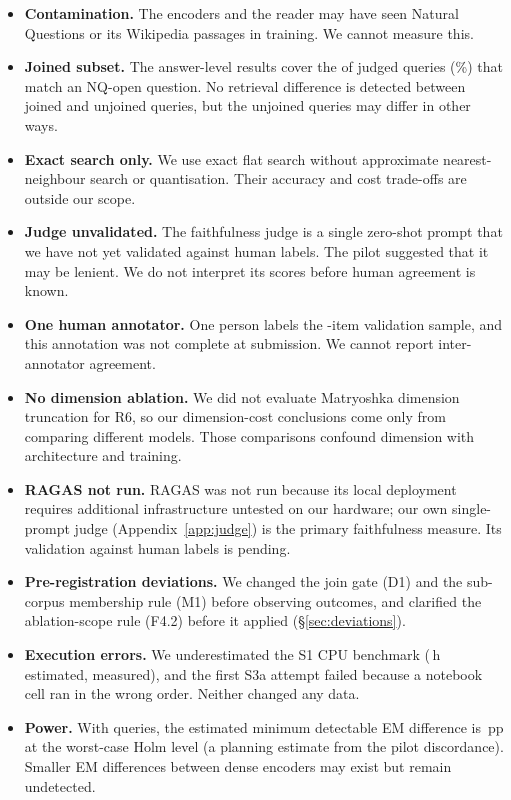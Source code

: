 \begin{itemize}
\item \textbf{Contamination.} The encoders and the reader may have seen Natural Questions or its Wikipedia passages in training. We cannot measure this.
\item \textbf{Joined subset.} The answer-level results cover the  of  judged queries (\%) that match an NQ-open question. No retrieval difference is detected between joined and unjoined queries, but the unjoined queries may differ in other ways.
\item \textbf{Exact search only.} We use exact flat search without approximate nearest-neighbour search or quantisation. Their accuracy and cost trade-offs are outside our scope.
\item \textbf{Judge unvalidated.} The faithfulness judge is a single zero-shot prompt that we have not yet validated against human labels. The pilot suggested that it may be lenient. We do not interpret its scores before human agreement is known.
\item \textbf{One human annotator.} One person labels the -item validation sample, and this annotation was not complete at submission. We cannot report inter-annotator agreement.
\item \textbf{No dimension ablation.} We did not evaluate Matryoshka dimension truncation \citep{kusupati2022matryoshka} for R6, so our dimension-cost conclusions come only from comparing different models. Those comparisons confound dimension with architecture and training.
\item \textbf{RAGAS not run.} RAGAS was not run because its local deployment requires additional infrastructure untested on our hardware; our own single-prompt judge (Appendix~\ref{app:judge}) is the primary faithfulness measure. Its validation against human labels is pending.
\item \textbf{Pre-registration deviations.} We changed the join gate (D1) and the sub-corpus membership rule (M1) before observing outcomes, and clarified the ablation-scope rule (F4.2) before it applied (\S\ref{sec:deviations}).
\item \textbf{Execution errors.} We underestimated the S1 CPU benchmark (\,h estimated,  measured), and the first S3a attempt failed because a notebook cell ran in the wrong order. Neither changed any data.
\item \textbf{Power.} With  queries, the estimated minimum detectable EM difference is \,pp at the worst-case Holm level (a planning estimate from the pilot discordance). Smaller EM differences between dense encoders may exist but remain undetected.
\end{itemize}
